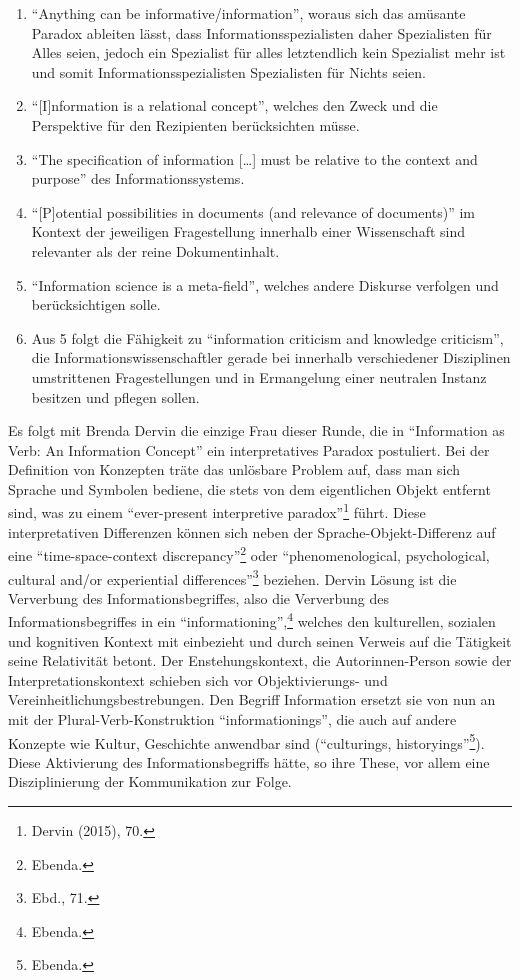 \documentclass[a4paper,
fontsize=11pt,
oneside,
numbers=noperiodatend,
parskip=half-,
bibliography=totoc,
final
]{scrartcl}
\begin{document}
\begin{enumerate}
\def\labelenumi{\arabic{enumi}.}
\item
  \enquote{Anything can be informative/information}, woraus sich das
  amüsante Paradox ableiten lässt, dass Informationsspezialisten daher
  Spezialisten für Alles seien, jedoch ein Spezialist für alles
  letztendlich kein Spezialist mehr ist und somit
  Informationsspezialisten Spezialisten für Nichts seien.
\item
  \enquote{{[}I{]}nformation is a relational concept}, welches den Zweck
  und die Perspektive für den Rezipienten berücksichten müsse.
\item
  \enquote{The specification of information {[}\ldots{}{]} must be
  relative to the context and purpose} des Informationssystems.
\item
  \enquote{{[}P{]}otential possibilities in documents (and relevance of
  documents)} im Kontext der jeweiligen Fragestellung innerhalb einer
  Wissenschaft sind relevanter als der reine Dokumentinhalt.
\item
  \enquote{Information science is a meta-field}, welches andere Diskurse
  verfolgen und berücksichtigen solle.
\item
  Aus 5 folgt die Fähigkeit zu \enquote{information criticism and
  knowledge criticism}, die Informationswissenschaftler gerade bei
  innerhalb verschiedener Disziplinen umstrittenen Fragestellungen und
  in Ermangelung einer neutralen Instanz besitzen und pflegen sollen.
\end{enumerate}

Es folgt mit Brenda Dervin die einzige Frau dieser Runde, die in
\enquote{Information as Verb: An Information Concept} ein
interpretatives Paradox postuliert. Bei der Definition von Konzepten
träte das unlösbare Problem auf, dass man sich Sprache und Symbolen
bediene, die stets von dem eigentlichen Objekt entfernt sind, was zu
einem \enquote{ever-present interpretive paradox}\footnote{Dervin
  (2015), 70.} führt. Diese interpretativen Differenzen können sich
neben der Sprache-Objekt-Differenz auf eine \enquote{time-space-context
discrepancy}\footnote{Ebenda.} oder \enquote{phenomenological,
psychological, cultural and/or experiential differences}\footnote{Ebd.,
  71.} beziehen. Dervin Lösung ist die Ververbung des
Informationsbegriffes, also die Ververbung des Informationsbegriffes in
ein \enquote{informationing},\footnote{Ebenda.} welches den kulturellen,
sozialen und kognitiven Kontext mit einbezieht und durch seinen Verweis
auf die Tätigkeit seine Relativität betont. Der Enstehungskontext, die
Autorinnen-Person sowie der Interpretationskontext schieben sich vor
Objektivierungs- und Vereinheitlichungsbestrebungen. Den Begriff
Information ersetzt sie von nun an mit der Plural-Verb-Konstruktion
\enquote{informationings}, die auch auf andere Konzepte wie Kultur,
Geschichte anwendbar sind (\enquote{culturings, historyings}\footnote{Ebenda.}).
Diese Aktivierung des Informationsbegriffs hätte, so ihre These, vor
allem eine Disziplinierung der Kommunikation zur Folge.
\end{document}
